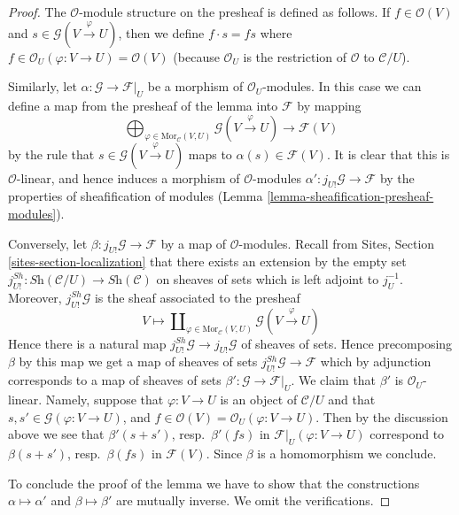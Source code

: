 \begin{proof}
The $\mathcal{O}$-module structure on the presheaf is defined as
follows. If $f \in \mathcal{O}(V)$ and
$s \in \mathcal{G}(V \xrightarrow{\varphi} U)$, then
we define $f \cdot s = fs$ where
$f \in \mathcal{O}_U(\varphi : V \to U) = \mathcal{O}(V)$
(because $\mathcal{O}_U$ is the restriction of $\mathcal{O}$ to
$\mathcal{C}/U$).

\medskip\noindent
Similarly, let $\alpha : \mathcal{G} \to \mathcal{F}|_U$ be a
morphism of $\mathcal{O}_U$-modules. In this case we can define
a map from the presheaf of the lemma into $\mathcal{F}$ by mapping
$$
\bigoplus\nolimits_{\varphi \in \text{Mor}_{\mathcal{C}}(V, U)}
\mathcal{G}(V \xrightarrow{\varphi} U)
\longrightarrow
\mathcal{F}(V)
$$
by the rule that $s \in \mathcal{G}(V \xrightarrow{\varphi} U)$
maps to $\alpha(s) \in \mathcal{F}(V)$. It is clear that this is
$\mathcal{O}$-linear, and hence induces a morphism of
$\mathcal{O}$-modules $\alpha' : j_{U!}\mathcal{G} \to \mathcal{F}$
by the properties of sheafification of modules
(Lemma \ref{lemma-sheafification-presheaf-modules}).

\medskip\noindent
Conversely, let $\beta : j_{U!}\mathcal{G} \to \mathcal{F}$
by a map of $\mathcal{O}$-modules.
Recall from Sites, Section \ref{sites-section-localization}
that there exists an extension by the empty set
$j^{Sh}_{U!} : \textit{Sh}(\mathcal{C}/U) \to \textit{Sh}(\mathcal{C})$
on sheaves of sets which is left adjoint to $j_U^{-1}$.
Moreover, $j^{Sh}_{U!}\mathcal{G}$ is the sheaf associated to the presheaf
$$
V
\longmapsto
\coprod\nolimits_{\varphi \in \text{Mor}_{\mathcal{C}}(V, U)}
\mathcal{G}(V \xrightarrow{\varphi} U)
$$
Hence there is a natural map
$j^{Sh}_{U!}\mathcal{G} \to j_{U!}\mathcal{G}$ of sheaves of sets.
Hence precomposing $\beta$ by this map we get a map of sheaves of sets
$j^{Sh}_{U!}\mathcal{G} \to \mathcal{F}$ which by adjunction corresponds
to a map of sheaves of sets $\beta' : \mathcal{G} \to \mathcal{F}|_U$.
We claim that $\beta'$ is $\mathcal{O}_U$-linear. Namely, suppose
that $\varphi : V \to U$ is an object of $\mathcal{C}/U$ and that
$s, s' \in \mathcal{G}(\varphi : V \to U)$, and
$f \in \mathcal{O}(V) = \mathcal{O}_U(\varphi : V \to U)$.
Then by the discussion above we see that 
$\beta'(s + s')$, resp.\  $\beta'(fs)$ in $\mathcal{F}|_U(\varphi : V \to U)$
correspond to $\beta(s + s')$, resp.\ $\beta(fs)$ in
$\mathcal{F}(V)$. Since $\beta$ is a homomorphism we conclude.

\medskip\noindent
To conclude the proof of the lemma we have to show that the constructions
$\alpha \mapsto \alpha'$ and $\beta \mapsto \beta'$ are mutually inverse.
We omit the verifications.
\end{proof}

